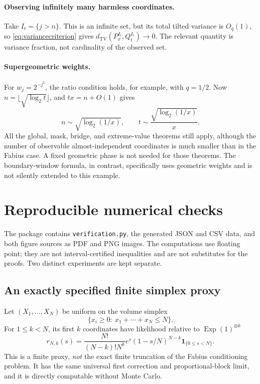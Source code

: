 \documentclass[11pt,letterpaper]{article}
\numberwithin{equation}{section}
\theoremstyle{definition}
\theoremstyle{remark}
\newcommand{\ind}{\mathbf 1}
\newcommand{\TV}{d_{\mathrm{TV}}}
\newcommand{\Exp}{\operatorname{Exp}}
\begin{document}
\paragraph{Observing infinitely many harmless coordinates.}
Take $I_t=\{j>n\}$. This is an infinite set, but its total tilted variance is
$O_q(1)$, so \eqref{eq:variancecriterion} gives
$\TV(P_x^{I_t},Q_t^{I_t})\to0$. The relevant quantity is variance fraction,
not cardinality of the observed set.

\paragraph{Supergeometric weights.}
For $w_j=2^{-j^2}$, the ratio condition holds, for example, with $q=1/2$.
Now $n=\lfloor\sqrt{\log_2t}\rfloor$, and $tx=n+O(1)$ gives
\[
 n\sim\sqrt{\log_2(1/x)},\qquad
 t\sim\frac{\sqrt{\log_2(1/x)}}{x}.
\]
All the global, mask, bridge, and extreme-value theorems still apply, although
the number of observable almost-independent coordinates is much smaller
than in the Fabius case. A fixed geometric phase is not needed for those
theorems. The boundary-window formula, in contrast, specifically uses geometric
weights and is not silently extended to this example.

\section{Reproducible numerical checks}
\label{sec:numerics}

The package contains \texttt{verification.py}, the generated JSON and CSV data,
and both figure sources as PDF and PNG images. The computations use floating
point; they are not interval-certified inequalities and are not substitutes
for the proofs. Two distinct experiments are kept separate.

\subsection{An exactly specified finite simplex proxy}

Let $(X_1,\ldots,X_N)$ be uniform on the volume simplex
\[
 \{x_i\ge0:\ x_1+\cdots+x_N\le N\}.
\]
For $1\le k<N$, its first $k$ coordinates have likelihood relative to
$\Exp(1)^{\otimes k}$
\begin{equation}
 r_{N,k}(s)=\frac{N!}{(N-k)!N^k}
 e^s(1-s/N)^{N-k}\ind_{\{0\le s<N\}}.
 \label{eq:finiteproxy}
\end{equation}
This is a finite proxy, \emph{not} the exact finite truncation of the Fabius
conditioning problem. It has the same universal first correction and
proportional-block limit, and it is directly computable without Monte Carlo.
\end{document}
